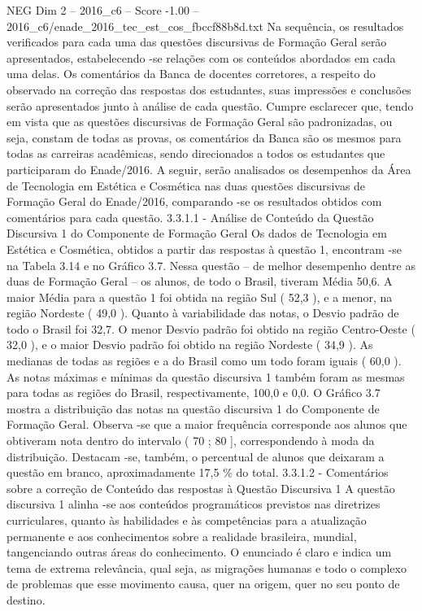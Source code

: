 \begin{textsample}{NEG Dim 2 – 2016\_c6 – Score -1.00 – 2016\_c6/enade\_2016\_tec\_est\_cos\_fbccf88b8d.txt}
Na sequência, os resultados verificados para cada uma das questões discursivas de Formação Geral serão apresentados, estabelecendo -se relações com os conteúdos abordados em cada uma delas.
Os comentários da Banca de docentes corretores, a respeito do observado na correção das respostas dos estudantes, suas impressões e conclusões serão apresentados junto à análise de cada questão.
Cumpre esclarecer que, tendo em vista que as questões discursivas de Formação Geral são padronizadas, ou seja, constam de todas as provas, os comentários da Banca são os mesmos para todas as carreiras acadêmicas, sendo direcionados a todos os estudantes que participaram do Enade/2016.
A seguir, serão analisados os desempenhos da Área de Tecnologia em Estética e Cosmética nas duas questões discursivas de Formação Geral do Enade/2016, comparando -se os resultados obtidos com comentários para cada questão. 3.3.1.1 - Análise de Conteúdo da Questão Discursiva 1 do Componente de Formação Geral Os dados de Tecnologia em Estética e Cosmética, obtidos a partir das respostas à questão 1, encontram -se na Tabela 3.14 e no Gráfico 3.7.
Nessa questão – de melhor desempenho dentre as duas de Formação Geral – os alunos, de todo o Brasil, tiveram Média 50,6.
A maior Média para a questão 1 foi obtida na região Sul ( 52,3 ), e a menor, na região Nordeste ( 49,0 ).
Quanto à variabilidade das notas, o Desvio padrão de todo o Brasil foi 32,7.
O menor Desvio padrão foi obtido na região Centro-Oeste ( 32,0 ), e o maior Desvio padrão foi obtido na região Nordeste ( 34,9 ).
As medianas de todas as regiões e a do Brasil como um todo foram iguais ( 60,0 ).
As notas máximas e mínimas da questão discursiva 1 também foram as mesmas para todas as regiões do Brasil, respectivamente, 100,0 e 0,0.
O Gráfico 3.7 mostra a distribuição das notas na questão discursiva 1 do Componente de Formação Geral.
Observa -se que a maior frequência corresponde aos alunos que obtiveram nota dentro do intervalo ( 70 ; 80 ], correspondendo à moda da distribuição.
Destacam -se, também, o percentual de alunos que deixaram a questão em branco, aproximadamente 17,5 \% do total. 3.3.1.2 - Comentários sobre a correção de Conteúdo das respostas à Questão Discursiva 1 A questão discursiva 1 alinha -se aos conteúdos programáticos previstos nas diretrizes curriculares, quanto às habilidades e às competências para a atualização permanente e aos conhecimentos sobre a realidade brasileira, mundial, tangenciando outras áreas do conhecimento.
O enunciado é claro e indica um tema de extrema relevância, qual seja, as migrações humanas e todo o complexo de problemas que esse movimento causa, quer na origem, quer no seu ponto de destino.

\end{textsample}
